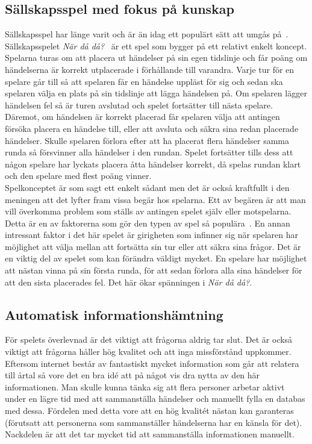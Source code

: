 \documentclass[a4paper, 11pt]{article}
\begin{document}
\subsection{Sällskapsspel med fokus på kunskap} \label{nardada}
Sällskapsspel har länge varit och är än idag ett populärt sätt att umgås på~\cite{bradspelspop}. Sällskapsspelet \textit{När då då?}~\cite{nardada} är ett spel som bygger på ett relativt enkelt koncept. Spelarna turas om att placera ut händelser på sin egen tidslinje och får poäng om händelserna är korrekt utplacerade i förhållande till varandra. Varje tur för en spelare går till så att spelaren får en händelse uppläst för sig och sedan ska spelaren välja en plats på sin tidslinje att lägga händelsen på. Om spelaren lägger händelsen fel så är turen avslutad och spelet fortsätter till nästa spelare. Däremot, om händelsen är korrekt placerad får spelaren välja att antingen försöka placera en händelse till, eller att avsluta och säkra sina redan placerade händelser. Skulle spelaren förlora efter att ha placerat flera händelser samma runda så försvinner alla händelser i den rundan. Spelet fortsätter tills dess att någon spelare har lyckats placera åtta händelser korrekt, då spelas rundan klart och den spelare med flest poäng vinner.\\


Spelkonceptet är som sagt ett enkelt sådant men det är också kraftfullt i den meningen att det lyfter fram vissa begär hos spelarna. Ett av begären är att man vill överkomma problem som ställs av antingen spelet själv eller motspelarna. Detta är en av faktorerna som gör den typen av spel så populära~\cite[sid 3--4]{psykologi}. En annan intressant faktor i det här spelet är girigheten som infinner sig när spelaren har möjlighet att välja mellan att fortsätta sin tur eller att säkra sina frågor. Det är en viktig del av spelet som kan förändra väldigt mycket. En spelare har möjlighet att nästan vinna på sin första runda, för att sedan förlora alla sina händelser för att den sista placerades fel. Det här ökar spänningen i \textit{När då då?}.

\subsection{Automatisk informationshämtning}
För spelets överlevnad är det viktigt att frågorna aldrig tar slut. Det är också viktigt att frågorna håller hög kvalitet och att inga missförstånd uppkommer. Eftersom internet består av fantastiskt mycket information som går att relatera till årtal så vore det en bra idé att på något vis dra nytta av den här informationen. Man skulle kunna tänka sig att flera personer arbetar aktivt under en lägre tid med att sammanställa händelser och manuellt fylla en databas med dessa. Fördelen med detta vore att en hög kvalitét nästan kan garanteras (förutsatt att personerna som sammanställer händelserna har en känsla för det). Nackdelen är att det tar mycket tid att sammanställa informationen manuellt.
\end{document}
